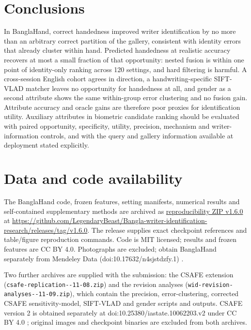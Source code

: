 \section{Conclusions}
\label{sec:conclusions}
In BanglaHand, correct handedness improved writer identification by no more than an arbitrary correct partition of the gallery, consistent with identity errors that already cluster within hand. Predicted handedness at realistic accuracy recovers at most a small fraction of that opportunity: nested fusion is within one point of identity-only ranking across 120 settings, and hard filtering is harmful. A cross-session English cohort agrees in direction, a handwriting-specific SIFT-VLAD matcher leaves no opportunity for handedness at all, and gender as a second attribute shows the same within-group error clustering and no fusion gain. Attribute accuracy and oracle gains are therefore poor proxies for identification utility. Auxiliary attributes in biometric candidate ranking should be evaluated with paired opportunity, specificity, utility, precision, mechanism and writer-information controls, and with the query and gallery information available at deployment stated explicitly.

\section*{Data and code availability}
The BanglaHand code, frozen features, setting manifests, numerical results and self-contained supplementary methods are archived as \href{https://github.com/LegendaryBeast/Bangla-writer-identification-research/releases/download/v1.6.0/wid-reproducibility-v1.6.0.zip}{reproducibility ZIP v1.6.0} at \url{https://github.com/LegendaryBeast/Bangla-writer-identification-research/releases/tag/v1.6.0}. The release supplies exact checkpoint references and table/figure reproduction commands. Code is MIT licensed; results and frozen features are CC BY 4.0. Photographs are excluded; obtain BanglaHand separately from Mendeley Data (doi:10.17632/n4sjstdzfy.1) \cite{banglahand2026data}.

Two further archives are supplied with the submission: the CSAFE extension (\texttt{csafe-replication--11-08.zip}) and the revision analyses (\texttt{wid-revision-\allowbreak analyses--11-09.zip}), which contain the precision, error-clustering, corrected CSAFE sensitivity-model, SIFT-VLAD and gender scripts and outputs. CSAFE version 2 is obtained separately at doi:10.25380/iastate.10062203.v2 under CC BY 4.0 \cite{crawford2026csafe}; original images and checkpoint binaries are excluded from both archives.

